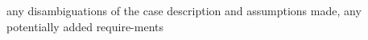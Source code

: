 any disambiguations of the  case  description and assumptions made, any potentially added require-ments